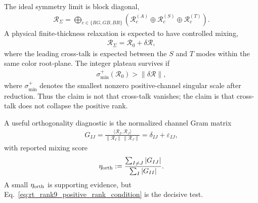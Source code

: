 The ideal symmetry limit is block diagonal,
\begin{align}
    \mathcal R_{\Sigma}
    =
    \bigoplus_{c\in\{RG,GB,BR\}}
    \left(
        \mathcal R_c^{(A)}
        \oplus
        \mathcal R_c^{(S)}
        \oplus
        \mathcal R_c^{(T)}
    \right).
    \label{eq:rt_rank9_block_diagonal_limit}
\end{align}
A physical finite-thickness relaxation is expected to have controlled mixing,
\begin{align}
    \mathcal R_{\Sigma}
    =
    \mathcal R_0+\delta\mathcal R,
    \label{eq:rt_rank9_perturbed_rigidity_matrix}
\end{align}
where the leading cross-talk is expected between the \(S\) and \(T\) modes within
the same color root-plane.  The integer plateau survives if
\begin{align}
    \sigma_{\min}^{+}(\mathcal R_0)
    >
    \|\delta\mathcal R\|,
    \label{eq:rt_rank9_rank_stability_bound}
\end{align}
where \(\sigma_{\min}^{+}\) denotes the smallest nonzero positive-channel
singular scale after reduction.  Thus the claim is not that cross-talk vanishes;
the claim is that cross-talk does not collapse the positive rank.

A useful orthogonality diagnostic is the normalized channel Gram matrix
\begin{align}
    G_{IJ}
    =
    \frac{\langle\mathcal R_I,\mathcal R_J\rangle}
         {\|\mathcal R_I\|\,\|\mathcal R_J\|}
    =
    \delta_{IJ}+\varepsilon_{IJ},
    \label{eq:rt_rank9_channel_gram_matrix}
\end{align}
with reported mixing score
\begin{align}
    \eta_{\rm orth}
    :=
    \frac{\sum_{I\ne J}|G_{IJ}|}{\sum_I |G_{II}|}.
    \label{eq:rt_rank9_orthogonality_score}
\end{align}
A small \(\eta_{\rm orth}\) is supporting evidence, but Eq.~\eqref{eq:rt_rank9_positive_rank_condition}
is the decisive test.

